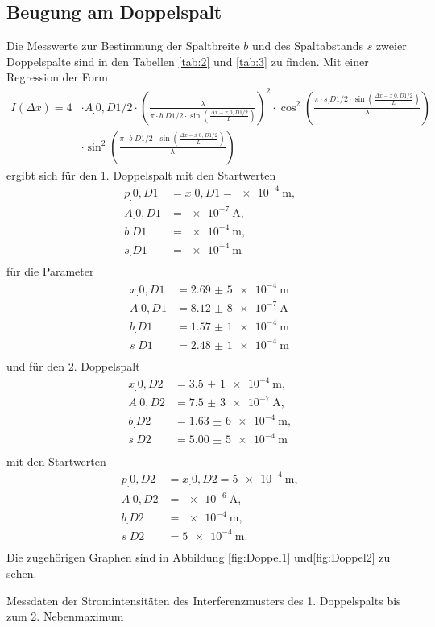 \subsection{Beugung am Doppelspalt}
Die Messwerte zur Bestimmung der Spaltbreite $b$ und des Spaltabstands $s$ zweier Doppelspalte sind in den Tabellen \ref{tab:2} und \ref{tab:3} zu finden.
Mit einer Regression der Form 
\[
\begin{split}
I(\Delta x)=4&\cdot A_.{0,D1/2}\cdot \left(
\frac{\lambda}{\pi\cdot b_.{D1/2}\cdot\sin{\left(\frac{\Delta x-x_.{0,D1/2}}{L}\right)}}\right)^2\cdot\cos^2{\left(\frac{\pi\cdot s_.{D1/2}\cdot \sin{\left(\frac{\Delta x-x_.{0,D1/2}}{L}\right)}}{\lambda}\right)}\\
&\cdot\sin^2{\left(\frac{\pi\cdot b_.{D1/2}\cdot\sin{\left(\frac{\Delta x-x_.{0,D1/2}}{L}\right)}}{\lambda}\right)}
\end{split}
\]
ergibt sich für den 1. Doppelspalt mit den Startwerten
\begin{align*}
p_.{0,D1}	&=x_.{0,D1} =\SI{e-4}{\metre}\text{,}\\
A_.{0,D1} 	&=\SI{e-7}{\ampere}\text{,}\\
b_.{D1} 	&=\SI{e-4}{\metre}\text{,}\\
s_.{D1} 	&=\SI{e-4}{\metre}\\
\end{align*}
für die Parameter
\begin{align*}
x_.{0,D1} &= \SI{2,69(5)e-4}{\metre}\\
A_.{0,D1} &= \SI{8,12(8)e-7}{\ampere}\\
b_.{D1}	  &= \SI{1,57(1)e-4}{\metre}\\
s_.{D1}	  &= \SI{2,48(1)e-4}{\metre}\\
\end{align*}
und für den 2. Doppelspalt 
\begin{align*}
x_.{0,D2} &= \SI{3,5(1)e-4}{\metre}\text{,}\\
A_.{0,D2} &= \SI{7,5(3)e-7}{\ampere}\text{,}\\
b_.{D2}	  &= \SI{1,63(6)e-4}{\metre}\text{,}\\
s_.{D2}	  &= \SI{5,00(5)e-4}{\metre}\\
\end{align*}
mit den Startwerten
\begin{align*}
p_.{0,D2}	&=x_.{0,D2} =\SI{5e-4}{\metre}\text{,}\\
A_.{0,D2} 	&=\SI{e-6}{\ampere}\text{,}\\
b_.{D2} 	&=\SI{e-4}{\metre}\text{,}\\
s_.{D2} 	&=\SI{5e-4}{\metre}\text{.}\\
\end{align*}
Die zugehörigen Graphen sind in Abbildung \ref{fig:Doppel1} und\ref{fig:Doppel2} zu sehen.
\begin{table}
	\centering
	\caption{Messdaten der Stromintensitäten des Interferenzmusters des 1. Doppelspalts bis zum 2. Nebenmaximum}
	
	
	\label{tab:2}
\end{table}

